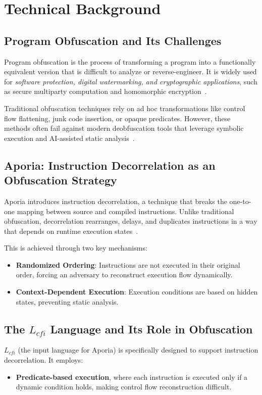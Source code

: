\section{Technical Background}

\subsection{Program Obfuscation and Its Challenges}
Program obfuscation is the process of transforming a program into a functionally equivalent version that is difficult to analyze or reverse-engineer. It is widely used for \textit{software protection, digital watermarking, and cryptographic applications}, such as secure multiparty computation and homomorphic encryption~\cite{ajorian2024aporia}. 

Traditional obfuscation techniques rely on ad hoc transformations like control flow flattening, junk code insertion, or opaque predicates. However, these methods often fail against modern deobfuscation tools that leverage symbolic execution and AI-assisted static analysis~\cite{ajorian2024aporia}. 

\subsection{Aporia: Instruction Decorrelation as an Obfuscation Strategy}
Aporia introduces instruction decorrelation, a technique that breaks the one-to-one mapping between source and compiled instructions. Unlike traditional obfuscation, decorrelation rearranges, delays, and duplicates instructions in a way that depends on runtime execution states~\cite{ajorian2024aporia}. 

This is achieved through two key mechanisms:
\begin{itemize}
    \item \textbf{Randomized Ordering}: Instructions are not executed in their original order, forcing an adversary to reconstruct execution flow dynamically.
    \item \textbf{Context-Dependent Execution}: Execution conditions are based on hidden states, preventing static analysis.
\end{itemize}

\subsection{The $L_{cfi}$ Language and Its Role in Obfuscation}
$L_{cfi}$ (the input language for Aporia) is specifically designed to support instruction decorrelation. It employs:
\begin{itemize}
    \item \textbf{Predicate-based execution}, where each instruction is executed only if a dynamic condition holds, making control flow reconstruction difficult.
\end{itemize}

